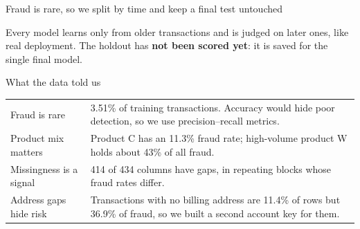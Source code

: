 \documentclass[aspectratio=169,10pt]{beamer}
\begin{document}
\begin{frame}{Fraud is rare, so we split by time and keep a final test untouched}
\vspace{0.2cm}
\hfill
{}\hfill
{}

\vspace{0.45cm}

\vspace{0.25cm}
\small Every model learns only from older transactions and is judged on later ones, like real deployment. The holdout has \textbf{not been scored yet}: it is saved for the single final model.
\end{frame}

\begin{frame}{What the data told us}
\vspace{0.2cm}
\renewcommand{\arraystretch}{1.4}
\begin{tabularx}{\linewidth}{@{}B{4.3cm}L@{}}
\toprule
Fraud is rare & 3.51\% of training transactions. Accuracy would hide poor detection, so we use precision--recall metrics. \\
Product mix matters & Product C has an 11.3\% fraud rate; high-volume product W holds about 43\% of all fraud. \\
Missingness is a signal & 414 of 434 columns have gaps, in repeating blocks whose fraud rates differ. \\
Address gaps hide risk & Transactions with no billing address are 11.4\% of rows but 36.9\% of fraud, so we built a second account key for them. \\
\bottomrule
\end{tabularx}
\vspace{0.3cm}

\end{frame}
\end{document}
